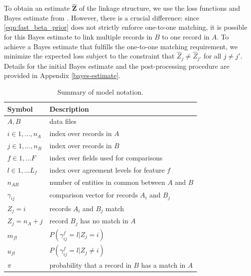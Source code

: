 \documentclass[ba]{imsart}
\begin{document}
To obtain an estimate $\hat{\bm{Z}}$ of the linkage structure, we use the loss functions and Bayes estimate from \cite{sadinle_bayesian_2017}. However, there is a crucial difference: since \ref{eqn:fast_beta_prior} does not strictly enforce one-to-one matching, it is possible for this Bayes estimate to link multiple records in $B$ to one record in $A$. To achieve a Bayes estimate that fulfills the one-to-one matching requirement, we minimize the expected loss subject to the constraint that $\hat{Z}_j \neq \hat{Z}_{j'}$ for all $j \neq j'$. Details for the initial Bayes estimate and the post-processing procedure are provided in Appendix \ref{bayes-estimate}.

\begin{table}[t!]
	\centering
	\begin{tabular}[t!]{ll}
		Symbol & Description \\
		\hline
		$A, B$ & data files\\
		$i \in 1, \ldots, n_A $ & index over records in $A$\\
		$j \in 1, \ldots, n_B $ & index over records in $B$\\
		$f \in 1, \ldots F$ & index over fields used for comparisons \\
		$l \in 1, \ldots L_f$ & index over agreement levels for feature $f$ \\
		$n_{AB}$ & number of entities in common between $A$ and $B$\\
		$\gamma_{ij}$ & comparison vector for records $A_i$ and $B_j$ \\
		$Z_j = i$ & records $A_i$ and $B_j$ match \\
		$Z_j = n_A + j$ & record $B_j$ has no match in $A$ \\
		$m_{fl}$ & $P(\gamma_{ij}^f = l | Z_j = i)$ \\
		$u_{fl}$ & $P(\gamma_{ij}^f = l | Z_j \neq i)$ \\
		$\pi$ & probability that a record in $B$ has a match in $A$ \\
		\hline
	\end{tabular}\caption{Summary of model notation.}\label{table_notation_A}
\end{table}
\end{document}

